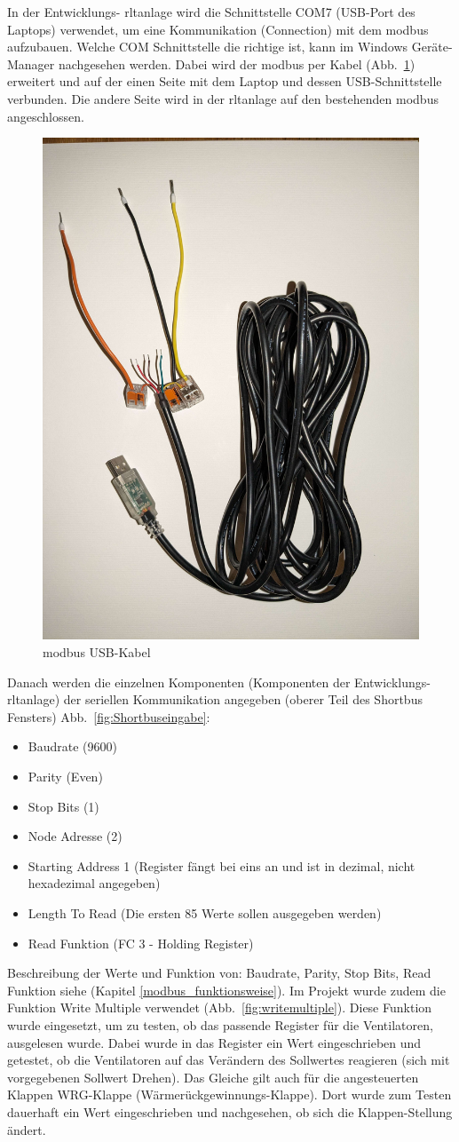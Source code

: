 In der Entwicklungs- \ac{rltanlage} wird die Schnittstelle COM7 (USB-Port des Laptops) verwendet, um eine Kommunikation (Connection) mit dem \gls{modbus} aufzubauen. Welche COM Schnittstelle die richtige ist, kann im Windows Geräte-Manager nachgesehen werden. Dabei wird der \gls{modbus} per Kabel  (Abb.~\ref{fig:modbus_usbkabel}) erweitert und auf der einen Seite mit dem Laptop und dessen USB-Schnittstelle verbunden. Die andere Seite wird in der \ac{rltanlage} auf den bestehenden \gls{modbus} angeschlossen. 

\begin{figure}[H]
	\centering
	\includegraphics[width=0.3\linewidth]{Bilder/modbus_usbkabel}
	\caption{\gls{modbus} USB-Kabel} 
	\label{fig:modbus_usbkabel}
\end{figure}

Danach werden die einzelnen Komponenten (Komponenten der Entwicklungs- \ac{rltanlage}) der seriellen Kommunikation angegeben (oberer Teil des Shortbus Fensters) Abb.~\ref{fig:Shortbuseingabe}:
\begin{itemize}
	\item Baudrate (9600)
	\item Parity (Even)
	\item Stop Bits (1)
	\item Node Adresse (2)
	\item Starting Address 1 (Register fängt bei eins an und ist in dezimal, nicht hexadezimal angegeben)
	\item Length To Read (Die ersten 85 Werte sollen ausgegeben werden)
	\item Read Funktion (FC 3 - Holding Register)
\end{itemize}

Beschreibung der Werte und Funktion von: Baudrate, Parity, Stop Bits, Read Funktion siehe (Kapitel \ref{modbus_funktionsweise}).
Im Projekt wurde zudem die Funktion Write Multiple verwendet (Abb.~\ref{fig:writemultiple}). Diese Funktion wurde eingesetzt, um zu testen, ob das passende Register für \zB die Ventilatoren, ausgelesen wurde. Dabei wurde in das Register ein Wert eingeschrieben und getestet, ob die Ventilatoren auf das Verändern des Sollwertes reagieren (sich mit vorgegebenen Sollwert Drehen). Das Gleiche gilt auch für die angesteuerten Klappen \zB WRG-Klappe (Wärmerückgewinnungs-Klappe). Dort wurde zum Testen dauerhaft ein Wert eingeschrieben und nachgesehen, ob sich die Klappen-Stellung ändert.

